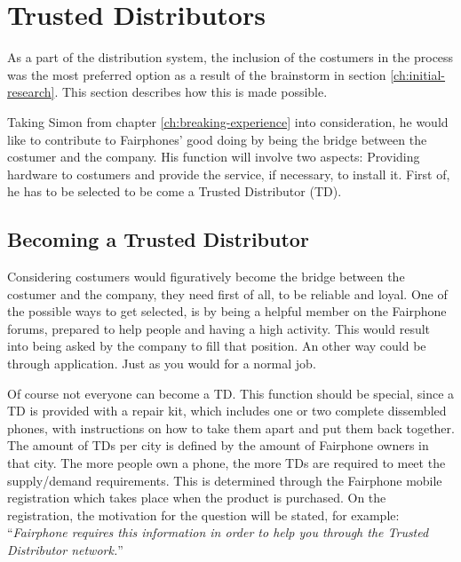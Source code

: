 \documentclass[final]{report} %
\begin{document}
\chapter{Trusted Distributors} %
\label{ch:trusted-distributors}
As a part of the distribution system, the inclusion of the costumers in the process was the most preferred option as a result of the brainstorm in section \ref{ch:initial-research}. This section describes how this is made possible.

Taking Simon from chapter \ref{ch:breaking-experience} into consideration, he would like to contribute to Fairphones' good doing by being the bridge between the costumer and the company. His function will involve two aspects: Providing hardware to costumers and provide the service, if necessary, to install it. First of, he has to be selected to be come a Trusted Distributor (TD).

\section{Becoming a Trusted Distributor}
Considering costumers would figuratively become the bridge between the costumer and the company, they need first of all, to be reliable and loyal. One of the possible ways to get selected, is by being a helpful member on the Fairphone forums, prepared to help people and having a high activity. This would result into being asked by the company to fill that position. An other way could be through application. Just as you would for a normal job. 

Of course not everyone can become a TD. This function should be special, since a TD is provided with a repair kit, which includes one or two complete dissembled phones, with instructions on how to take them apart and put them back together. The amount of TDs per city is defined by the amount of Fairphone owners in that city. The more people own a phone, the more TDs are required to meet the supply/demand requirements. This is determined through the Fairphone mobile registration which takes place when the product is purchased. On the registration, the motivation for the question will be stated, for example: ``\textit{Fairphone requires this information in order to help you through the Trusted Distributor network.}''  

\end{document}
